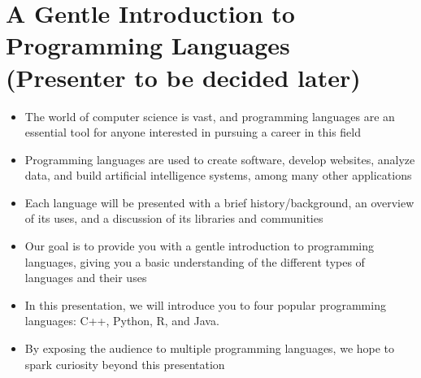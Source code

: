 \section{A Gentle Introduction to Programming Languages \\ (Presenter to be decided later)}

\begin{itemize}
	\item The world of computer science is vast, and programming languages are an essential tool for anyone interested in pursuing a career in this field
	\item Programming languages are used to create software, develop websites, analyze data, and build artificial intelligence systems, among many other applications
	\item Each language will be presented with a brief history/background, an overview of its uses, and a discussion of its libraries and communities
	\item Our goal is to provide you with a gentle introduction to programming languages, giving you a basic understanding of the different types of languages and their uses
	\item In this presentation, we will introduce you to four popular programming languages: C++, Python, R, and Java.
	\item By exposing the audience to multiple programming languages, we hope to spark curiosity beyond this presentation
\end{itemize}